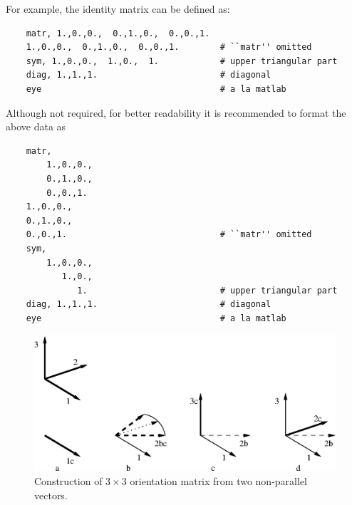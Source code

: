 For example, the identity matrix can be defined as:
\begin{verbatim}
    matr, 1.,0.,0.,  0.,1.,0.,  0.,0.,1.
    1.,0.,0.,  0.,1.,0.,  0.,0.,1.        # ``matr'' omitted
    sym, 1.,0.,0.,  1.,0.,  1.            # upper triangular part
    diag, 1.,1.,1.                        # diagonal
    eye                                   # a la matlab
\end{verbatim}
Although not required, for better readability it is recommended to format
the above data as
\begin{verbatim}
    matr,
        1.,0.,0.,
        0.,1.,0.,
        0.,0.,1.
    1.,0.,0.,
    0.,1.,0.,
    0.,0.,1.                              # ``matr'' omitted
    sym,
        1.,0.,0.,
           1.,0.,
              1.                          # upper triangular part
    diag, 1.,1.,1.                        # diagonal
    eye                                   # a la matlab
\end{verbatim}

\begin{figure}
\centering
{}
\includegraphics[width=.9\textwidth]{MatR2vec}
\caption{Construction of $3 \times 3$ orientation matrix from two
non-parallel vectors.}
\label{fig:general:orientation-matrices:MatR2vec}
\end{figure}

